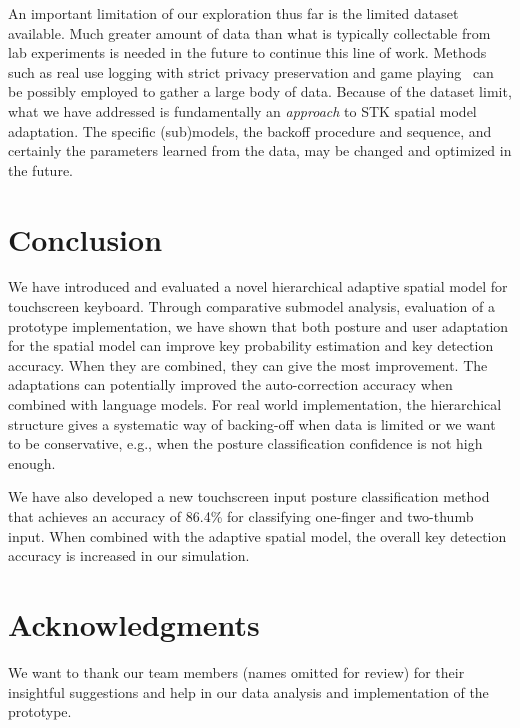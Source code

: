 \documentclass{sigchi}
\begin{document}
An important limitation of our exploration thus far is the limited dataset available. Much greater amount of data than what is typically collectable from lab experiments  is needed in the future to continue this line of work. Methods such as real use logging with strict privacy preservation and game playing~\cite{Rudchenko:2011} can be possibly employed to gather a large body of data. Because of the dataset limit, what we have addressed is fundamentally an \textit{approach} to STK spatial model adaptation. The specific (sub)models, the backoff procedure and sequence, and certainly the parameters learned from the data, may be changed and optimized in the future. 

\section{Conclusion}
We have introduced and evaluated a novel hierarchical adaptive spatial model for
touchscreen keyboard. Through comparative submodel analysis,  evaluation of a prototype implementation, we have shown that both posture and user adaptation for the spatial model can improve key probability estimation and key detection accuracy. When they are combined, they can
give the most improvement. The adaptations can potentially
improved the auto-correction accuracy when combined with language models. For real world
implementation, the
hierarchical structure gives a systematic way of backing-off  when data is limited
or we want to be conservative, e.g., when the posture classification confidence is not 
high enough. 

We have also developed a new touchscreen input posture classification method
that achieves an accuracy of 86.4\% for classifying one-finger and two-thumb input. When
combined with the adaptive spatial model, the overall key detection accuracy is increased
in our simulation.

\section{Acknowledgments}
We want to thank our team members (names omitted for review) for their insightful
suggestions and help in  our data analysis and implementation of the prototype. 

\balance

\small


\end{document}
